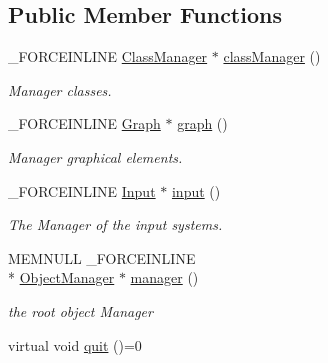 \subsection*{Public Member Functions}
\begin{DoxyCompactItemize}
\item 
\hypertarget{classcsad_1_1_core_a8ed42063dccc8a04d02ec7c7c12e631d}{\-\_\-\-F\-O\-R\-C\-E\-I\-N\-L\-I\-N\-E \hyperlink{classcsad_1_1_class_manager}{Class\-Manager} $\ast$ \hyperlink{classcsad_1_1_core_a8ed42063dccc8a04d02ec7c7c12e631d}{class\-Manager} ()}\label{classcsad_1_1_core_a8ed42063dccc8a04d02ec7c7c12e631d}

\begin{DoxyCompactList}\small\item\em Manager classes. \end{DoxyCompactList}\item 
\hypertarget{classcsad_1_1_core_a8fddcefd07424ba6b09e5732c44cde57}{\-\_\-\-F\-O\-R\-C\-E\-I\-N\-L\-I\-N\-E \hyperlink{classcsad_1_1_graph}{Graph} $\ast$ \hyperlink{classcsad_1_1_core_a8fddcefd07424ba6b09e5732c44cde57}{graph} ()}\label{classcsad_1_1_core_a8fddcefd07424ba6b09e5732c44cde57}

\begin{DoxyCompactList}\small\item\em Manager graphical elements. \end{DoxyCompactList}\item 
\hypertarget{classcsad_1_1_core_aae3c05a0d844dd7d2091959937c915ff}{\-\_\-\-F\-O\-R\-C\-E\-I\-N\-L\-I\-N\-E \hyperlink{classcsad_1_1_input}{Input} $\ast$ \hyperlink{classcsad_1_1_core_aae3c05a0d844dd7d2091959937c915ff}{input} ()}\label{classcsad_1_1_core_aae3c05a0d844dd7d2091959937c915ff}

\begin{DoxyCompactList}\small\item\em The Manager of the input systems. \end{DoxyCompactList}\item 
\hypertarget{classcsad_1_1_core_a1afeb01a16e7286c9801405eb7211e3c}{M\-E\-M\-N\-U\-L\-L \-\_\-\-F\-O\-R\-C\-E\-I\-N\-L\-I\-N\-E \\*
\hyperlink{classcsad_1_1_object_manager}{Object\-Manager} $\ast$ \hyperlink{classcsad_1_1_core_a1afeb01a16e7286c9801405eb7211e3c}{manager} ()}\label{classcsad_1_1_core_a1afeb01a16e7286c9801405eb7211e3c}

\begin{DoxyCompactList}\small\item\em the root object Manager \end{DoxyCompactList}\item 
\hypertarget{classcsad_1_1_core_a618ee56f40d4e272e5af92aef115becf}{virtual void \hyperlink{classcsad_1_1_core_a618ee56f40d4e272e5af92aef115becf}{quit} ()=0}\label{classcsad_1_1_core_a618ee56f40d4e272e5af92aef115becf}


\end{DoxyCompactItemize}
